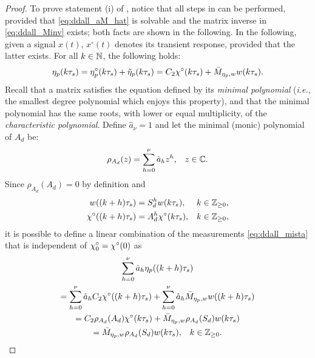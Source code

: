 \begin{proof}
  To prove statement (i) of , notice that all steps in  can be performed, provided that \eqref{eq:ddall_aM_hat} is solvable and the matrix inverse in \eqref{eq:ddall_Minv} exists; both facts are shown in the following.
  In the following, given a signal $x(t)$, $x^{\circ}(t)$ denotes its transient response, provided that the latter exists.
  For all $k\in\mathbb{N}$, the following holds:
  \begin{equation}
    \label{eq:ddall_mista}
    \eta_p(k\tau_s) = \eta_p^{\circ}(k\tau_s) + \tilde{\eta}_p(k\tau_s) = C_2\chi^{\circ}(k\tau_s) + \bar{M}_{\eta_p,w}w(k\tau_s).
  \end{equation}
  Recall \cite[App. A.8]{kailath_linear_1980} that a matrix satisfies the equation defined by its \emph{minimal polynomial} (\emph{i.e.}, the smallest degree polynomial which enjoys this property), and that the minimal polynomial has the same roots, with lower or equal multiplicity, of the \emph{characteristic polynomial}.
  Define $\hat{a}_\nu=1$ and let the minimal (monic) polynomial of $A_d$ be:
  \begin{align}
    \rho_{A_d}(z) &= \sum_{h=0}^{\nu}\hat{a}_h z^h, & z\in\mathbb{C}.
  \end{align}
  Since $\rho_{A_d}(A_d)=0$ by definition and
  \begin{subequations}
    \begin{align}
      w((k+h)\tau_s) &= S_d^h w(k\tau_s), & k\in\mathbb{Z}_{\geq 0}, \\
      \chi^{\circ}((k+h)\tau_s) &= A_d^h \chi^{\circ}(k\tau_s), & k\in\mathbb{Z}_{\geq 0},
    \end{align}
  \end{subequations}
  it is possible to define a linear combination of the measurements \eqref{eq:ddall_mista} that is independent of $\chi^{\circ}_0=\chi^{\circ}(0)$ as
  \begin{multline}
    \label{eq:ddall_menomista}
    \sum_{h=0}^{\nu} \hat{a}_h \bboutp((k+h)\tau_s)\\
    = \sum_{h=0}^{\nu} \hat{a}_h C_2 \bbstate^{\circ}((k+h)\tau_s) + \sum_{h=0}^{\nu} \hat{a}_h \bar{M}_{\bboutp,\bbexostate}\bbexostate((k+h)\tau_s)\\
    = C_2 \rho_{A_d}(A_d) \bbstate^{\circ}(k\tau_s) + \bar{M}_{\bboutp,\bbexostate} \rho_{A_d}(\exodynmat_d)\bbexostate(k\tau_s)\\
    \begin{aligned}= \bar{M}_{\bboutp,\bbexostate} \rho_{A_d}(\exodynmat_d)\bbexostate(k\tau_s), && k\in\Z_{\geq 0}.\end{aligned}

\end{multline}
\end{proof}
